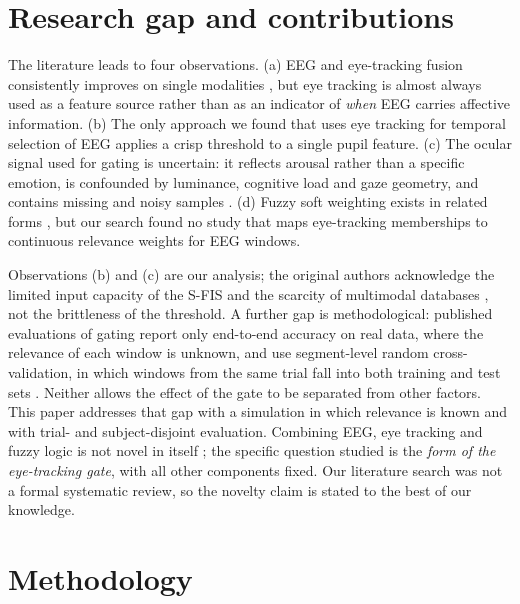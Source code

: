 \section{Research gap and contributions}
\label{sec:gap}

The literature leads to four observations. (a) EEG and eye-tracking fusion consistently improves on single modalities \cite{Lu2015,Zheng2019,Liu2022}, but eye tracking is almost always used as a feature source rather than as an indicator of \emph{when} EEG carries affective information. (b) The only approach we found that uses eye tracking for temporal selection of EEG \cite{FarhadiSedehi2024a,FarhadiSedehi2024b} applies a crisp threshold to a single pupil feature. (c) The ocular signal used for gating is uncertain: it reflects arousal rather than a specific emotion, is confounded by luminance, cognitive load and gaze geometry, and contains missing and noisy samples \cite{Bradley2008,Mathot2018,Raiturkar2016,Holmqvist2012}. (d) Fuzzy soft weighting exists in related forms \cite{LinWang2002,Jacobs1991,Lu2015}, but our search found no study that maps eye-tracking memberships to continuous relevance weights for EEG windows.

Observations (b) and (c) are our analysis; the original authors acknowledge the limited input capacity of the S-FIS and the scarcity of multimodal databases \cite{FarhadiSedehi2024a}, not the brittleness of the threshold. A further gap is methodological: published evaluations of gating report only end-to-end accuracy on real data, where the relevance of each window is unknown, and use segment-level random cross-validation, in which windows from the same trial fall into both training and test sets \cite{FarhadiSedehi2024a,Li2021,Khan2025}. Neither allows the effect of the gate to be separated from other factors. This paper addresses that gap with a simulation in which relevance is known and with trial- and subject-disjoint evaluation. Combining EEG, eye tracking and fuzzy logic is not novel in itself \cite{Lu2015,FarhadiSedehi2024a}; the specific question studied is the \emph{form of the eye-tracking gate}, with all other components fixed. Our literature search was not a formal systematic review, so the novelty claim is stated to the best of our knowledge.

\section{Methodology}
\label{sec:method}

